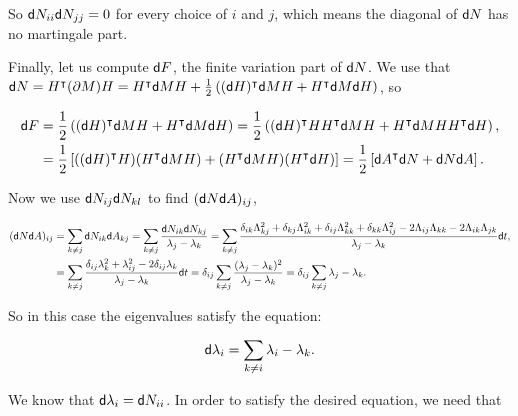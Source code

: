 So $\mathsf d N_{ii} \mathsf d N_{jj} = 0$ for every choice of $i$ and $j$, which means the diagonal of $\mathsf d N$ has no martingale part.

Finally, let us compute $\mathsf d F$, the finite variation part of $\mathsf d N$. We use that $\mathsf d N = H^{\intercal} (\partial M) H = H^{\intercal}\mathsf d M H + \frac12\left((\mathsf d H)^{\intercal}\mathsf d M H + H^{\intercal}\mathsf d M \mathsf d H\right)$, so

\begin{align*}
    \mathsf d F &= \frac12\left((\mathsf d H)^{\intercal}\mathsf d M H + H^{\intercal}\mathsf d M \mathsf d H\right) = \frac12\left((\mathsf d H)^{\intercal}HH^{\intercal}\mathsf d M H + H^{\intercal}\mathsf d M HH^{\intercal} \mathsf d H\right),\\
    &=  \frac12\left[((\mathsf d H)^{\intercal}H)(H^{\intercal}\mathsf d M H) + (H^{\intercal}\mathsf d M H)(H^{\intercal} \mathsf d H)\right] = \frac12\left[\mathsf d A^{\intercal}\mathsf d N + \mathsf d N\mathsf d A \right].\\
\end{align*}

Now we use $\mathsf d N_{ij}\mathsf d N_{kl}$ to find $(\mathsf d N\mathsf d A)_{ij}$,

\begin{align*}
    (\mathsf d N\mathsf d A)_{ij} &= \sum_{k\neq j} \mathsf d N_{ik} \mathsf d A_{kj} = \sum_{k\neq j} \frac{\mathsf d N_{ik} \mathsf d N_{kj}}{\lambda_j - \lambda_k} = \sum_{k\neq j} \frac{\delta_{ik}\Lambda^2_{kj} + \delta_{kj}\Lambda^2_{ik} + \delta_{ij}\Lambda^2_{kk} + \delta_{kk}\Lambda^2_{ij} -2\Lambda_{ij}\Lambda_{kk}-2\Lambda_{ik}\Lambda_{jk}}{\lambda_j - \lambda_k}\mathsf d t,\\
    &= \sum_{k\neq j} \frac{ \delta_{ij}\lambda_k^2 + \lambda^2_{ij} - 2\delta_{ij}\lambda_k}{\lambda_j - \lambda_k}\mathsf d t = \delta_{ij}\sum_{k \neq j} \frac{(\lambda_j - \lambda_k)^2}{\lambda_j - \lambda_k} = \delta_{ij}\sum_{k\neq j} \lambda_j - \lambda_k.
\end{align*}

So in this case the eigenvalues satisfy the equation:

\begin{equation*}
    \mathsf d \lambda_i = \sum_{k\neq i} \lambda_i - \lambda_k.
\end{equation*}


We know that $\mathsf d \lambda_i = \mathsf d N_{ii}$. In order to satisfy the desired equation, we need that 

